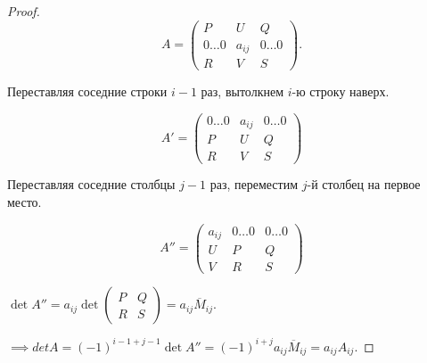 \begin{proof}
    \begin{equation*}
        A = \left(
            \begin{array}{c|c|c}
              P & U & Q \\
              \hline
              0 \dots 0 & a_{ij} & 0 \dots 0 \\
              \hline
              R & V & S
            \end{array}
        \right)
    .\end{equation*}

    Переставляя соседние строки $i - 1$ раз, вытолкнем $i$-ю строку наверх.

    \begin{equation*}
        A' = \left(
            \begin{array}{c|c|c}
                0 \dots 0 & a_{ij} & 0 \dots 0 \\
                \hline
                P & U & Q \\
                \hline
                R & V & S
            \end{array}
        \right)
    \end{equation*}

    Переставляя соседние столбцы $j - 1$ раз, переместим $j$-й столбец на первое место.

    \begin{equation*}
        A'' = \left(
            \begin{array}{c|c|c}
                a_{ij} & 0 \dots 0 & 0 \dots 0 \\
                \hline
                U & P & Q \\
                \hline
                V & R & S
            \end{array}
        \right)
    \end{equation*}

    $\det A'' = a_{ij} \det \left(
        \begin{array}{c|c}
            P & Q \\
            \hline
            R & S
        \end{array}
    \right) = a_{ij} \overline{M}_{ij}$.

    \bigskip
    $\implies det A = (-1)^{i - 1 + j - 1} \det A'' = (-1)^{i + j} a_{ij} \overline{M}_{ij} = a_{ij} A_{ij}$.

\end{proof}


